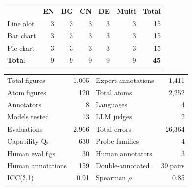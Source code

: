\noindent
\begin{minipage}[t]{0.48\textwidth}
\scriptsize
{}\label{tab:adv-samples}
\begin{tabular}{@{}lrrrrrr@{}}
\toprule
 & \textbf{EN} & \textbf{BG} & \textbf{CN} & \textbf{DE} & \textbf{Multi} & \textbf{Total} \\
\midrule
Line plot & 3 & 3 & 3 & 3 & 3 & 15 \\
Bar chart & 3 & 3 & 3 & 3 & 3 & 15 \\
Pie chart & 3 & 3 & 3 & 3 & 3 & 15 \\
\midrule
\textbf{Total} & 9 & 9 & 9 & 9 & 9 & \textbf{45} \\
\bottomrule
\end{tabular}
\end{minipage}\hfill
\begin{minipage}[t]{0.48\textwidth}
\scriptsize
{}\label{tab:corpus-stats}
\begin{tabular}{@{}lr@{\qquad}lr@{}}
\toprule
Total figures & 1,005 & Expert annotations & 1,411 \\
Atom figures & 120 & Total atoms & 2,252 \\
Annotators & 8 & Languages & 4 \\
Models tested & 13 & LLM judges & 2 \\
Evaluations & 2,966 & Total errors & 26,364 \\
Capability Qs & 630 & Probe families & 4 \\
\midrule
Human eval figs & 30 & Human annotators & 3 \\
Human annotations & 159 & Double-annotated & 39 pairs \\
ICC(2,1) & 0.91 & Spearman $\rho$ & 0.85 \\
\bottomrule
\end{tabular}
\end{minipage}

